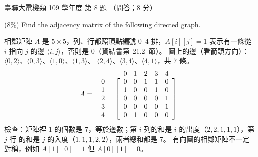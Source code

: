 \begin{pastexam}[label={px:ust-109-ee-ds-08}]{臺聯大電機類 109 學年度 第 8 題}
（問答；8 分）

(8\%) Find the adjacency matrix of the following directed graph.

\begin{center}
\end{center}
\end{pastexam}

\begin{pastsoln}
相鄰矩陣 $A$ 是 $5 \times 5$，列、行都照頂點編號 $0$--$4$ 排，$A[i][j] = 1$ 表示有一條從 $i$
指向 $j$ 的邊 $\langle i, j \rangle$，否則是 $0$（資結書第~21.2~節）。 圖上的邊（看箭頭方向）：
$\langle 0, 2 \rangle$、$\langle 0, 3 \rangle$、$\langle 1, 0 \rangle$、$\langle 1, 3 \rangle$、
$\langle 2, 4 \rangle$、$\langle 3, 4 \rangle$、$\langle 4, 1 \rangle$，共 $7$ 條。
\[
A =
\begin{array}{c@{\quad}c}
 & \begin{array}{ccccc} 0 & 1 & 2 & 3 & 4 \end{array} \\
\begin{array}{c} 0 \\ 1 \\ 2 \\ 3 \\ 4 \end{array} &
\left[\begin{array}{ccccc}
0 & 0 & 1 & 1 & 0 \\
1 & 0 & 0 & 1 & 0 \\
0 & 0 & 0 & 0 & 1 \\
0 & 0 & 0 & 0 & 1 \\
0 & 1 & 0 & 0 & 0
\end{array}\right]
\end{array}
\]
檢查：矩陣裡 $1$ 的個數是 $7$，等於邊數；第 $i$ 列的和是 $i$ 的出度（$2, 2, 1, 1, 1$），第 $j$ 行
的和是 $j$ 的入度（$1, 1, 1, 2, 2$），兩者總和都是 $7$。 有向圖的相鄰矩陣不一定對稱，例如
$A[1][0] = 1$ 但 $A[0][1] = 0$。
\end{pastsoln}
